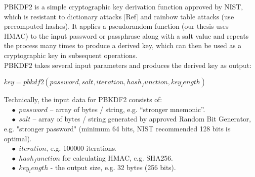 PBKDF2 is a simple cryptographic key derivation function approved by NIST, which is resistant to dictionary attacks [Ref] and rainbow table attacks (use precomputed hashes). It applies a pseudorandom function (our thesis uses HMAC) to the input password or passphrase along with a salt value and repeats the process many times to produce a derived key, which can then be used as a cryptographic key in subsequent operations.\\
\vspace{0.2cm}
PBKDF2 takes several input parameters and produces the derived key as output:\\
\vspace{0.2cm}
\begin{center}
$key = pbkdf2(password, salt, iteration, hash_function, key_length)$\\
\end{center}
\vspace{0.2cm}
Technically, the input data for PBKDF2 consists of:\\
$\quad\bullet$ $password$ – array of bytes / string, e.g. “stronger mnemonic”.\\
$\quad\bullet$ $salt$ – array of bytes / string generated by approved Random Bit Generator, e.g. "stronger password" (minimum 64 bits, NIST recommended 128 bits is optimal).\\
$\quad\bullet$ $iteration$, e.g. 100000 iterations.\\
$\quad\bullet$ $hash_function$ for calculating HMAC, e.g. SHA256.\\
$\quad\bullet$ $key_length$ - the output size, e.g. 32 bytes (256 bits).\\
